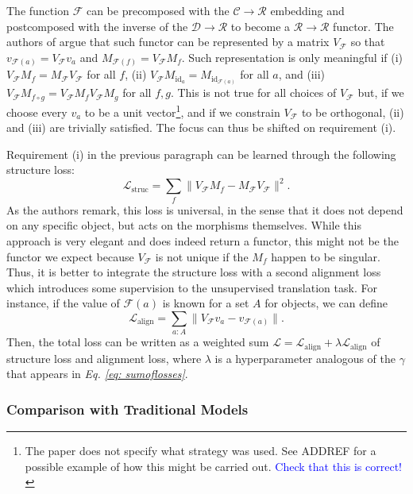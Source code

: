 \documentclass[12pt,a4paper,openright,twoside]{report}
\theoremstyle{plain}
\theoremstyle{definition}
\begin{document}
The function $\mathcal{F}$ can be precomposed with the $\mathcal{C} \to \mathcal{R}$ embedding and postcomposed with the inverse of the $\mathcal{D} \to \mathcal{R}$ to become a $\mathcal{R} \to \mathcal{R}$ functor. The authors of \cite{sheshmani2021categorical} argue that such functor can be represented by a matrix $V_\mathcal{F}$ so that $v_{\mathcal{F}(a)} =  V_\mathcal{F}v_a$ and $M_{\mathcal{F}(f)} = V_\mathcal{F}M_f$. Such representation is only meaningful if (i) $V_{\mathcal{F}}M_f = M_{\mathcal{F}}V_{\mathcal{F}}$ for all $f$, (ii) $V_{\mathcal{F}}M_{\mathrm{id}_a} = M_{\mathrm{id}_{\mathcal{F}(a)}}$ for all $a$, and (iii) $V_{\mathcal{F}}M_{f \circ g} = V_{\mathcal{F}}M_fV_{\mathcal{F}}M_g$ for all $f,g$. This is not true for all choices of  $V_\mathcal{F}$ but, if we choose every $v_a$ to be a unit vector\footnote{The paper does not specify what strategy was used. See ADDREF for a possible example of how this might be carried out. \textcolor{blue}{Check that this is correct!}}, and if we constrain $V_{\mathcal{F}}$ to be orthogonal, (ii) and (iii) are trivially satisfied. The focus can thus be shifted on requirement (i).


Requirement (i) in the previous paragraph can be learned through the following structure loss:
\[\mathcal{L}_{\mathrm{struc}} = \sum_{f}\|V_{\mathcal{F}}M_f - M_{\mathcal{F}}V_{\mathcal{F}}\|^2.\]
As the authors remark, this loss is universal, in the sense that it does not depend on any specific object, but acts on the morphisms themselves. While this approach is very elegant and does indeed return a functor, this might not be the functor we expect because $V_{\mathcal{F}}$ is not unique if the $M_f$ happen to be singular. Thus, it is better to integrate the structure loss with a second alignment loss which introduces some supervision to the unsupervised translation task. For instance, if the value of $\mathcal{F}(a)$ is known for a set $A$ for objects, we can define
\[\mathcal{L}_{\mathrm{align}} = \sum_{a : A}\|V_{\mathcal{F}}v_a - v_{\mathcal{F}(a)}\|.\]
Then, the total loss can be written as a weighted sum $\mathcal{L} = \mathcal{L}_{\mathrm{align}} + \lambda \mathcal{L}_{\mathrm{align}}$ of structure loss and alignment loss, where $\lambda$ is a hyperparameter analogous of the $\gamma$ that appears in \textit{Eq. \ref{eq: sumoflosses}}.


\subsubsection{Comparison with Traditional Models}
\end{document}
